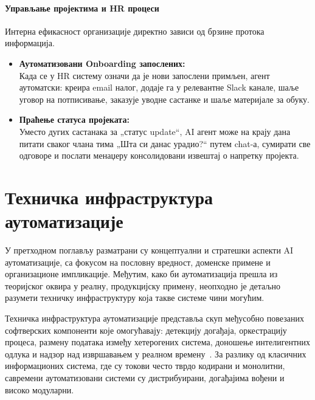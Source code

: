 \paragraph{Управљање пројектима и HR процеси}

Интерна ефикасност организације директно зависи од брзине протока информација.

\begin{itemize}
    \item \textbf{Аутоматизовани Onboarding запослених:} \\
    Када се у HR систему означи да је нови запослени примљен, агент аутоматски: креира email налог, додаје га у релевантне Slack канале, шаље уговор на потписивање, заказује уводне састанке и шаље материјале за обуку.
    
    \item \textbf{Праћење статуса пројеката:} \\
    Уместо дугих састанака за „статус update“, AI агент може на крају дана питати сваког члана тима „Шта си данас урадио?“ путем chat-а, сумирати све одговоре и послати менаџеру консолидовани извештај о напретку пројекта.
\end{itemize}


\newpage


\section{Техничка инфраструктура аутоматизације}
\label{sec:tehnicka-infrastruktura}

У претходном поглављу разматрани су концептуални и стратешки аспекти AI аутоматизације, са фокусом на пословну вредност,
доменске примене и организационе импликације. Међутим, како би аутоматизација прешла из теоријског оквира у реалну,
продукцијску примену, неопходно је детаљно разумети техничку инфраструктуру која такве системе чини могућим.

Техничка инфраструктура аутоматизације представља скуп међусобно повезаних софтверских компоненти које омогућавају:
детекцију догађаја, оркестрацију процеса, размену података између хетерогених система, доношење интелигентних одлука
и надзор над извршавањем у реалном времену~\cite{omg2014bpmn,vanderaalst2016}. За разлику од класичних информационих система, где су токови често
тврдо кодирани и монолитни, савремени аутоматизовани системи су дистрибуирани, догађајима вођени и високо модуларни.

